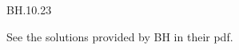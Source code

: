 

\setcounter{theorem}{22}
\begin{exercise} BH.10.23
\begin{solution}
See the solutions provided by BH in their pdf.

\end{solution}
\end{exercise}



